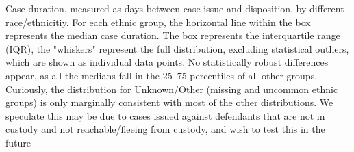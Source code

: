 Case duration, measured as days between case issue and disposition, by different race/ethnicitiy. For each ethnic group, the horizontal line within the box represents the median case duration. The box represents the interquartile range (IQR), the "whiskers" represent the full distribution, excluding statistical outliers, which are shown as individual data points. No statistically robust differences appear, as all the medians fall in the 25--75 percentiles of all other groups. Curiously, the distribution for Unknown/Other (missing and uncommon ethnic groups) is only marginally consistent with most of the other distributions. We speculate this may be due to cases issued against defendants that are not in custody and not reachable/fleeing from custody, and wish to test this in the future

\label{fig:DurationsEthnicity}